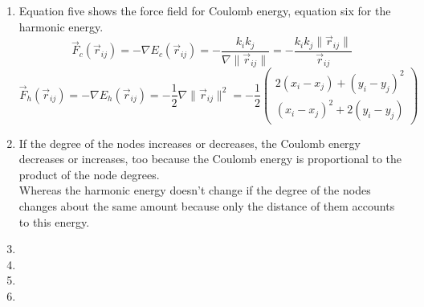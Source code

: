 \documentclass[10pt,a4paper]{article}
\begin{document}
\begin{enumerate}
\item Equation five shows the force field for Coulomb energy, equation six for the harmonic energy.
\begin{equation}
\vec{F}_c(\vec{r}_{ij}) = -\nabla E_c(\vec{r}_{ij})
= -\frac{k_i k_j}{\nabla \|\vec{r}_{ij}\|}
= -\frac{k_i k_j \|\vec{r}_{ij}\|}{\vec{r}_{ij}}
\end{equation}
\begin{equation}
\vec{F}_h(\vec{r}_{ij}) = -\nabla E_h(\vec{r}_{ij})
= -\frac{1}{2} \nabla \|\vec{r}_{ij}\|^2
= -\frac{1}{2} \begin{pmatrix}
2(x_i-x_j) + (y_i-y_j)^2 \\
(x_i-x_j)^2 + 2(y_i-y_j)
\end{pmatrix}
\end{equation}

\item If the degree of the nodes increases or decreases, the Coulomb energy decreases or increases, too because the Coulomb energy is proportional to the product of the node degrees.\\
Whereas the harmonic energy doesn't change if the degree of the nodes changes about the same amount because only the distance of them accounts to this energy.

\item 

\item %

\item

\item
\end{enumerate}
\end{document}
